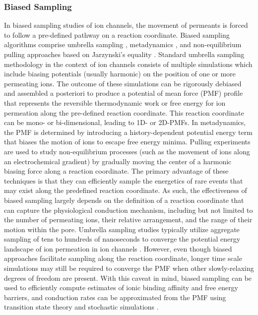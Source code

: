 \begin{refsection}
 \subsubsection{Biased Sampling}
 In biased sampling studies of ion channels, the movement of permeants is forced to follow a pre-defined pathway on a reaction coordinate.  Biased sampling algorithms comprise umbrella sampling \cite{Torrie:1974hs}, metadynamics \cite{Laio:2002ft,Laio:2008iw}, and non-equilibrium pulling approaches based on Jarzynski's equality \cite{Jarzynski:1997uj}.  Standard umbrella sampling methodology in the context of ion channels consists of multiple simulations which include biasing potentials (usually harmonic) on the position of one or more permeating ions.  The outcome of these simulations can be rigorously debiased and assembled a posteriori to produce a potential of mean force (PMF) profile that represents the reversible thermodynamic work or free energy for ion permeation along the pre-defined reaction coordinate.  This reaction coordinate can be mono- or bi-dimensional, leading to 1D- or 2D-PMFs.  In metadynamics, the PMF is determined by introducing a history-dependent potential energy term that biases the motion of ions to escape free energy minima.  Pulling experiments are used to study non-equilibrium processes (such as the movement of ions along an electrochemical gradient) by gradually moving the center of a harmonic biasing force along a reaction coordinate.  The primary advantage of these techniques is that they can efficiently sample the energetics of rare events that may exist along the predefined reaction coordinate.  As such, the effectiveness of biased sampling largely depends on the definition of a reaction coordinate that can capture the physiological conduction mechanism, including but not limited to the number of permeating ions, their relative arrangement, and the range of their motion within the pore.  Umbrella sampling studies typically utilize aggregate sampling of tens to hundreds of nanoseconds to converge the potential energy landscape of ion permeation in ion channels \cite{Allen:2006vy,Fowler:2013bb}.  However, even though biased approaches facilitate sampling along the reaction coordinate, longer time scale simulations may still be required to converge the PMF when other slowly-relaxing degrees of freedom are present.  With this caveat in mind, biased sampling can be used to efficiently compute estimates of ionic binding affinity and free energy barriers, and conduction rates can be approximated from the PMF using transition state theory and stochastic simulations \cite{Berneche:2003ua,Crouzy:1994eg}.
 

\end{refsection}
